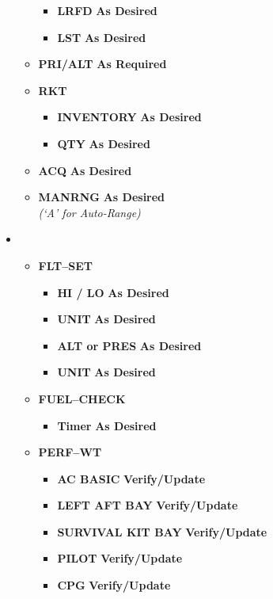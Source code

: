 \documentclass[fontHelvetica]{TechCheck}
\begin{document}
\begin{itemize}[leftmargin=0.1\linewidth,rightmargin=0.1\linewidth, itemsep=4pt]
\begin{itemize}[itemsep=4pt]
\begin{itemize}[itemsep=4pt]
				\item \textbf{LRFD} \dotfill \textbf{As Desired}
				\item \textbf{LST} \dotfill \textbf{As Desired}
			\end{itemize}
			\item \textbf{PRI/ALT} \dotfill \textbf{As Required}
			\item \textbf{RKT}
			\begin{itemize}[itemsep=4pt]
				\item \textbf{INVENTORY} \dotfill \textbf{As Desired}
				\item \textbf{QTY} \dotfill \textbf{As Desired}
			\end{itemize}
			\item \textbf{ACQ} \dotfill \textbf{As Desired}
			\item \textbf{MANRNG} \dotfill \textbf{As Desired} \\
			\hfill \emph{(`A' for Auto-Range)}
		\end{itemize}
		\item {}
		\begin{itemize}[itemsep=4pt]
			\item \textbf{FLT--SET}
			\begin{itemize}[itemsep=4pt]
				\item \textbf{HI / LO} \dotfill \textbf{As Desired}
				\item \textbf{UNIT} \dotfill \textbf{As Desired}
				\item \textbf{ALT or PRES} \dotfill \textbf{As Desired}
				\item \textbf{UNIT} \dotfill \textbf{As Desired}
			\end{itemize}
			\item \textbf{FUEL--CHECK}
			\begin{itemize}[itemsep=4pt]
				\item \textbf{Timer} \dotfill \textbf{As Desired}
			\end{itemize}
			\item \textbf{PERF--WT}
			\begin{itemize}[itemsep=4pt]
				\item \textbf{AC BASIC} \dotfill \textbf{Verify/Update}
				\item \textbf{LEFT AFT BAY} \dotfill \textbf{Verify/Update}
				\item \textbf{SURVIVAL KIT BAY} \dotfill \textbf{Verify/Update}
				\item \textbf{PILOT} \dotfill \textbf{Verify/Update}
				\item \textbf{CPG} \dotfill \textbf{Verify/Update}

\end{itemize}
\end{itemize}
\end{itemize}
\end{document}

